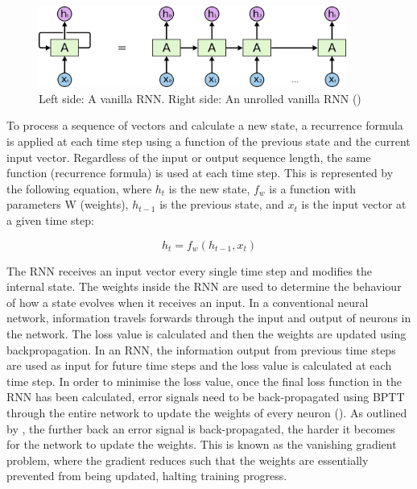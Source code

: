\begin{figure}[ht!]
\centering
\includegraphics[width=0.9\textwidth]{media/literature/machine_learning/ml_rnn_unrolled.png}
\caption[Diagram of an unrolled Recurrent Neural Network]{Left side: A vanilla \acrlong{RNN}. Right side: An unrolled vanilla \acrlong{RNN} (\cite{colah_lstm_2019})}
\label{fig:rnn_unrolled}
\end{figure}

To process a sequence of vectors and calculate a new state, a recurrence formula is applied at each time step using a function of the previous state and the current input vector. Regardless of the input or output sequence length, the same function (recurrence formula) is used at each time step. This is represented by the following equation, where $h_t$ is the new state, $f_w$ is a function with parameters W (weights), $h_{t-1}$ is the previous state, and $x_t$ is the input vector at a given time step: 

\begin{equation}
    h_{t} = f_{w} \left ( h_{t-1},x_{t} \right )
\end{equation}

The \acrshort{RNN} receives an input vector every single time step and modifies the internal state. The weights inside the \acrshort{RNN} are used to determine the behaviour of how a state evolves when it receives an input. 
In a conventional neural network, information travels forwards through the input and output of neurons in the network. The loss value is calculated and then the weights are updated using backpropagation.
In an \acrshort{RNN}, the information output from previous time steps are used as input for future time steps and the loss value is calculated at each time step. In order to minimise the loss value, once the final loss function in the \acrshort{RNN} has been calculated, error signals need to be back-propagated using \acrfull{BPTT} through the entire network to update the weights of every neuron (\cite{salehinejad_recent_rnn_2018}).
As outlined by \cite{bengio_learning_1994}, the further back an error signal is back-propagated, the harder it becomes for the network to update the weights. This is known as the vanishing gradient problem, where the gradient reduces such that the weights are essentially prevented from being updated, halting training progress.

